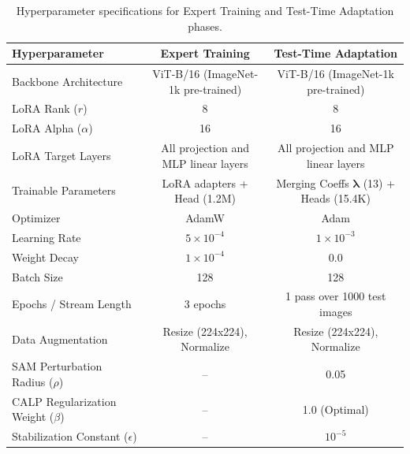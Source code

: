 \documentclass{article}
\begin{document}
\begin{table}[h]
\caption{Hyperparameter specifications for Expert Training and Test-Time Adaptation phases.}
\label{tab:hyperparameters}
\vskip 0.1in
\begin{center}
\begin{small}
\begin{sc}
\begin{tabular}{lcc}
\toprule
Hyperparameter & Expert Training & Test-Time Adaptation \\
\midrule
Backbone Architecture & ViT-B/16 (ImageNet-1k pre-trained) & ViT-B/16 (ImageNet-1k pre-trained) \\
LoRA Rank ($r$) & 8 & 8 \\
LoRA Alpha ($\alpha$) & 16 & 16 \\
LoRA Target Layers & All projection and MLP linear layers & All projection and MLP linear layers \\
Trainable Parameters & LoRA adapters + Head (1.2M) & Merging Coeffs $\boldsymbol{\lambda}$ (13) + Heads (15.4K) \\
Optimizer & AdamW & Adam \\
Learning Rate & $5 \times 10^{-4}$ & $1 \times 10^{-3}$ \\
Weight Decay & $1 \times 10^{-4}$ & 0.0 \\
Batch Size & 128 & 128 \\
Epochs / Stream Length & 3 epochs & 1 pass over 1000 test images \\
Data Augmentation & Resize (224x224), Normalize & Resize (224x224), Normalize \\
SAM Perturbation Radius ($\rho$) & -- & 0.05 \\
CALP Regularization Weight ($\beta$) & -- & 1.0 (Optimal) \\
Stabilization Constant ($\epsilon$) & -- & $10^{-5}$ \\
\bottomrule
\end{tabular}
\end{sc}
\end{small}
\end{center}
\end{table}
\end{document}
